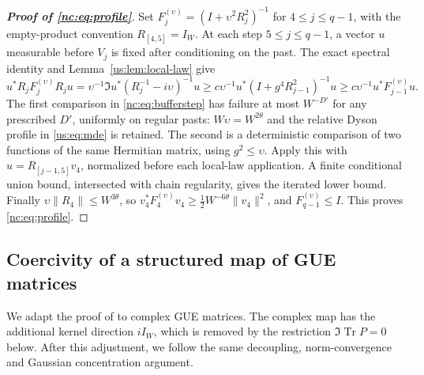 \documentclass[11pt]{article}
\numberwithin{equation}{section}
\theoremstyle{remark}
\newcommand{\Tr}{\operatorname{Tr}}
\newcommand{\norm}[1]{\left\|#1\right\|}
\begin{document}
\begin{proof}[\textbf{Proof of \eqref{nc:eq:profile}}]
Set $F_j^{(\upsilon)}=(I+\upsilon^2R_j^2)^{-1}$ for
$4\le j\le q-1$, with the empty-product convention $R_{[4,5]}=I_W$.
At each step $5\le j\le q-1$, a vector $u$ measurable before $V_j$ is fixed after
conditioning on the past. The exact spectral identity and
Lemma~\ref{us:lem:local-law} give
\begin{equation}
 u^*R_jF_j^{(\upsilon)}R_ju
 =\upsilon^{-1}\Im u^*(R_j^{-1}-i\upsilon)^{-1}u
 \ge c\upsilon^{-1}u^*(I+g^{4}R_{j-1}^2)^{-1}u
 \ge c\upsilon^{-1}u^*F_{j-1}^{(\upsilon)}u.
 \label{nc:eq:bufferstep}
\end{equation}
The first comparison in \eqref{nc:eq:bufferstep} has failure at most $W^{-D'}$ for any prescribed
$D'$, uniformly on regular pasts: $W\upsilon=W^{2\theta}$ and the
relative Dyson profile in \eqref{us:eq:mde} is retained. The second is a
deterministic comparison of two functions of the same Hermitian matrix,
using $g^2\le\upsilon$. Apply this with $u=R_{[j-1,5]}v_4$, normalized before
each local-law application. A finite conditional union bound, intersected
with chain regularity, gives the iterated lower bound. Finally
$\upsilon\norm{R_4}\le W^{3\theta}$, so
$v_4^*F_4^{(\upsilon)}v_4\ge\tfrac12W^{-6\theta}\|v_4\|^2$, and
$F_{q-1}^{(\upsilon)}\le I$. This proves \eqref{nc:eq:profile}.
\end{proof}

\subsection{Coercivity of a structured map of GUE matrices}
\label{app:compact-gaussian}

We adapt the proof of \cite[Lemma~A.2]{Drogin} to complex GUE matrices.
The complex map has the additional kernel direction \(iI_W\), which
is removed by the restriction \(\Im\Tr P=0\) below. After this
adjustment, we follow the same decoupling, norm-convergence and
Gaussian concentration argument.
\end{document}
